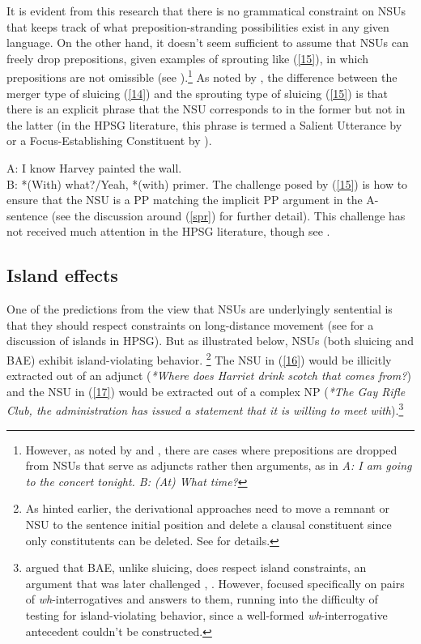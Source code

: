 It is evident from this research that there is no grammatical constraint on NSUs that keeps track of what preposition-stranding possibilities exist in any given language. On the other hand, it doesn't seem sufficient to assume that NSUs can freely drop prepositions, given examples of sprouting like (\ref{15}), in which prepositions are not omissible (see \citealt{Chung1995}).\footnote{However, as noted by \citet{Ginzburg:Sag:2000} and \citet{Hardt2020}, there are cases where prepositions are dropped from NSUs that serve as adjuncts rather then arguments, as in \textit{A: I am going to the concert tonight. B: (At) What time?}}  As noted by \citet{Chung1995},
the difference between the
merger type of sluicing (\ref{14}) and the sprouting type of sluicing (\ref{15}) is that there is an explicit phrase that the NSU corresponds to in the former but not in the latter (in the HPSG literature, this phrase is termed a Salient Utterance by \citealt[313]{Ginzburg:Sag:2000} or a Focus-Establishing Constituent by \citealt{Ginzburg2012}). 

\ea A: I know Harvey painted the wall.\\B: *(With) what?/Yeah, *(with) primer.\label{15}\z
%
The challenge posed by (\ref{15}) is how to ensure that
the NSU is a PP matching the implicit PP argument in 
the A-sentence (see the discussion
around %
(\ref{spr}) for further detail). This challenge has not received much attention in the HPSG literature, though see \citet{Kim2015}.



\subsection{Island effects}
\label{sec-island-effects}

One of the predictions from the view that NSUs are underlyingly sentential is that they should respect  constraints on long-distance movement (see  for a discussion of islands in HPSG). But as illustrated below, NSUs (both sluicing and BAE) exhibit island-violating behavior.%
\footnote{As hinted earlier, the derivational approaches
need to move a remnant or NSU to the sentence initial position and delete a clausal constituent since only constitutents can be deleted. See \citet{Merchant2001,Merchant2010} for details.} The NSU  in (\ref{16}) would be illicitly extracted out of an adjunct (\textit{*Where does Harriet drink scotch that comes from?}) and the NSU  in (\ref{17}) would be extracted out of a complex NP (\textit{*The Gay Rifle Club, the administration has issued a statement that it is willing to meet with}).\footnote{\citet{Merchant2005a} argued that BAE, unlike sluicing, does respect island constraints, an argument that was later challenged \citep[see, e.g.,][239]{CJ2005a}, \citealt{Griffiths2014}. However, \citet{Merchant2005a} focused specifically on pairs of \emph{wh}-interrogatives and answers to them, running into the difficulty of testing for island-violating behavior, since a well-formed \emph{wh}-interrogative antecedent couldn't be constructed.}

